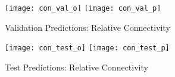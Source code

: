 \begin{figure}[H]
\centering
\texttt{[image: con\_val\_o]}
\texttt{[image: con\_val\_p]}
\caption{Validation Predictions: Relative Connectivity}
\label{fig:pred-val-con}
\end{figure}

\begin{figure}[H]
\centering
\texttt{[image: con\_test\_o]}
\texttt{[image: con\_test\_p]}
\caption{Test Predictions: Relative Connectivity}
\label{fig:pred-tes-con}
\end{figure}


